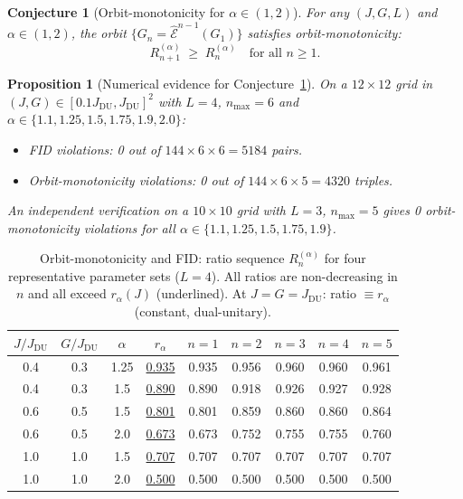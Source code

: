 \documentclass[12pt,a4paper]{article}
\newtheorem{proposition}[theorem]{Proposition}
\newtheorem{conjecture}[theorem]{Conjecture}
\begin{document}
\begin{conjecture}[Orbit-monotonicity for $\alpha\in(1,2)$]
\label{conj:orbit_mono}
For any $(J,G,L)$ and $\alpha\in(1,2)$, the orbit $\{G_n=\hat{\mathcal{E}}^{n-1}(G_1)\}$
satisfies orbit-monotonicity:
\[
  R_{n+1}^{(\alpha)}\;\geq\; R_n^{(\alpha)} \quad\text{for all }n\geq 1.
\]
\end{conjecture}

\begin{proposition}[Numerical evidence for Conjecture~\ref{conj:orbit_mono}]
\label{prop:om_numerics}
On a $12\times 12$ grid in $(J,G)\in[0.1J_{\mathrm{DU}},J_{\mathrm{DU}}]^2$
with $L=4$, $n_{\max}=6$ and $\alpha\in\{1.1,1.25,1.5,1.75,1.9,2.0\}$:
\begin{itemize}
\item \emph{FID violations}: 0 out of $144\times 6\times 6 = 5184$ pairs.
\item \emph{Orbit-monotonicity violations}: 0 out of $144\times 6\times 5 = 4320$ triples.
\end{itemize}
An independent verification on a $10\times 10$ grid with $L=3$, $n_{\max}=5$
gives 0 orbit-monotonicity violations for all $\alpha\in\{1.1,1.25,1.5,1.75,1.9\}$.
\end{proposition}

\begin{table}[h!]
\centering
\caption{Orbit-monotonicity and FID: ratio sequence $R_n^{(\alpha)}$ for four
representative parameter sets ($L=4$).  All ratios are non-decreasing in $n$ and
all exceed $r_\alpha(J)$ (underlined).  At $J=G=J_{\mathrm{DU}}$: ratio $\equiv r_\alpha$
(constant, dual-unitary).}
\label{tab:om_ratios}
\begin{tabular}{cc|c|cccccc}
$J/J_{\mathrm{DU}}$ & $G/J_{\mathrm{DU}}$ & $\alpha$ & $r_\alpha$ & $n=1$ & $n=2$ & $n=3$ & $n=4$ & $n=5$ \\
\hline
0.4 & 0.3 & 1.25 & \underline{0.935} & 0.935 & 0.956 & 0.960 & 0.960 & 0.961 \\
0.4 & 0.3 & 1.5 & \underline{0.890} & 0.890 & 0.918 & 0.926 & 0.927 & 0.928 \\
0.6 & 0.5 & 1.5 & \underline{0.801} & 0.801 & 0.859 & 0.860 & 0.860 & 0.864 \\
0.6 & 0.5 & 2.0 & \underline{0.673} & 0.673 & 0.752 & 0.755 & 0.755 & 0.760 \\
1.0 & 1.0 & 1.5 & \underline{0.707} & 0.707 & 0.707 & 0.707 & 0.707 & 0.707 \\
1.0 & 1.0 & 2.0 & \underline{0.500} & 0.500 & 0.500 & 0.500 & 0.500 & 0.500 \\
\end{tabular}
\end{table}
\end{document}
